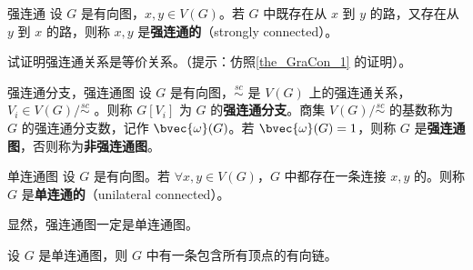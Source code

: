 \begin{definition}{强连通}
设 $G$ 是有向图，$x,y\in V(G)$。若 $G$ 中既存在从 $x$ 到 $y$ 的路，又存在从 $y$ 到 $x$ 的路，则称 $x,y$ 是\textbf{强连通的}（strongly connected）。
\end{definition}

\begin{exercise}{}
试证明强连通关系是等价关系。（提示：仿照\autoref{the_GraCon_1} 的证明）。
\end{exercise}

\begin{definition}{强连通分支，强连通图}
设 $G$ 是有向图，$\overset{sc}{\sim}$ 是 $V(G)$ 上的强连通关系，$V_i\in V(G)/\overset{sc}{\sim}$ 。则称 $G[V_i]$ 为 $G$ 的\textbf{强连通分支}。商集 $V(G)/\overset{sc}{\sim}$ 的基数称为 $G$ 的强连通分支数，记作 $\bvec{\omega}(G)$。若 $\bvec{\omega}(G)=1$，则称 $G$ 是\textbf{强连通图}，否则称为\textbf{非强连通图}。
\end{definition}

\begin{definition}{单连通图}
设 $G$ 是有向图。若 $\forall x,y\in V(G)$，$G$ 中都存在一条连接 $x,y$ 的。则称 $G$ 是\textbf{单连通的}（unilateral connected）。
\end{definition}

显然，强连通图一定是单连通图。

\begin{theorem}{}
设 $G$ 是单连通图，则 $G$ 中有一条包含所有顶点的有向链。
\end{theorem}









